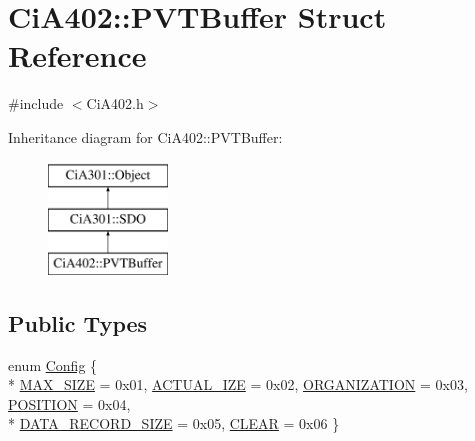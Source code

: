 \hypertarget{struct_ci_a402_1_1_p_v_t_buffer}{}\section{Ci\+A402\+:\+:P\+V\+T\+Buffer Struct Reference}
\label{struct_ci_a402_1_1_p_v_t_buffer}


{\ttfamily \#include $<$Ci\+A402.\+h$>$}

Inheritance diagram for Ci\+A402\+:\+:P\+V\+T\+Buffer\+:\begin{figure}[H]
\begin{center}
\leavevmode
\includegraphics[height=3.000000cm]{dc/d91/struct_ci_a402_1_1_p_v_t_buffer}
\end{center}
\end{figure}
\subsection*{Public Types}
\begin{DoxyCompactItemize}
\item 
enum \hyperlink{struct_ci_a402_1_1_p_v_t_buffer_ab39588e1f028f9838c2a85fce3f74926}{Config} \{ \\*
\hyperlink{struct_ci_a402_1_1_p_v_t_buffer_ab39588e1f028f9838c2a85fce3f74926ae7555e4da3733a103dcf97c8d0a78a68}{M\+A\+X\+\_\+\+S\+I\+Z\+E} = 0x01, 
\hyperlink{struct_ci_a402_1_1_p_v_t_buffer_ab39588e1f028f9838c2a85fce3f74926a477d59b02656bf3ac4a141ab97ca5491}{A\+C\+T\+U\+A\+L\+\_\+\+I\+Z\+E} = 0x02, 
\hyperlink{struct_ci_a402_1_1_p_v_t_buffer_ab39588e1f028f9838c2a85fce3f74926a704e9ee6d32403fb41ebeac87040169b}{O\+R\+G\+A\+N\+I\+Z\+A\+T\+I\+O\+N} = 0x03, 
\hyperlink{struct_ci_a402_1_1_p_v_t_buffer_ab39588e1f028f9838c2a85fce3f74926a7384b0c0c8a358e4ebbf3008e494cf07}{P\+O\+S\+I\+T\+I\+O\+N} = 0x04, 
\\*
\hyperlink{struct_ci_a402_1_1_p_v_t_buffer_ab39588e1f028f9838c2a85fce3f74926aea0a09cf7b145586d56a5577760bd5c4}{D\+A\+T\+A\+\_\+\+R\+E\+C\+O\+R\+D\+\_\+\+S\+I\+Z\+E} = 0x05, 
\hyperlink{struct_ci_a402_1_1_p_v_t_buffer_ab39588e1f028f9838c2a85fce3f74926a52825a98de8250e1b2fe3fbb8f9d29a4}{C\+L\+E\+A\+R} = 0x06
 \}
\end{DoxyCompactItemize}
